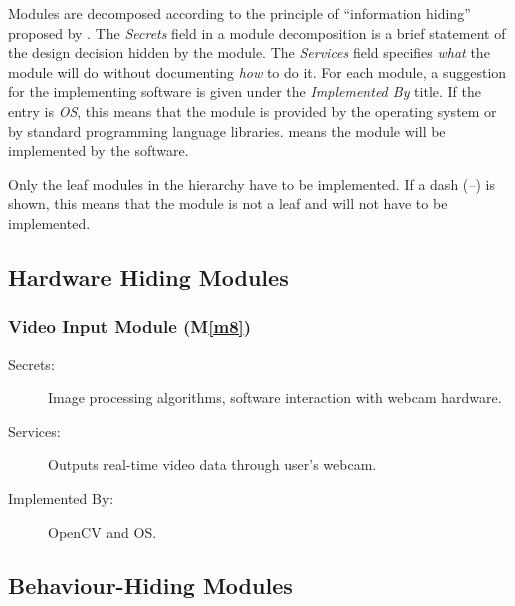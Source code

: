 \documentclass[12pt, titlepage]{article}
\newcommand{\mref}[1]{M\ref{#1}}
\begin{document}
Modules are decomposed according to the principle of ``information hiding''
proposed by \citet{ParnasEtAl1984}. The \emph{Secrets} field in a module
decomposition is a brief statement of the design decision hidden by the
module. The \emph{Services} field specifies \emph{what} the module will do
without documenting \emph{how} to do it. For each module, a suggestion for the
implementing software is given under the \emph{Implemented By} title. If the
entry is \emph{OS}, this means that the module is provided by the operating
system or by standard programming language libraries.  \emph{\progname{}} means the
module will be implemented by the \progname{} software.

Only the leaf modules in the hierarchy have to be implemented. If a dash
(\emph{--}) is shown, this means that the module is not a leaf and will not have
to be implemented.

\subsection{Hardware Hiding Modules}


\subsubsection{Video Input Module (\mref{m8})}
\begin{description}
\item[Secrets:] Image processing algorithms, software interaction with webcam hardware.
\item[Services:] Outputs real-time video data through user's webcam.
\item[Implemented By:] OpenCV and OS.
\end{description}

\subsection{Behaviour-Hiding Modules}
\end{document}
